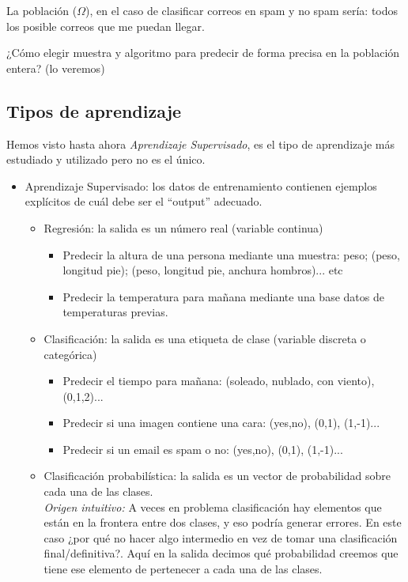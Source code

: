 \documentclass[11pt,a4paper]{article}
\theoremstyle{definition}
\begin{document}
	La población ($\Omega$), en el caso de clasificar correos en spam y no spam sería: todos los posible correos que me puedan llegar.
	
	¿Cómo elegir muestra y algoritmo para predecir de forma precisa en la población entera? (lo veremos)
	\subsection{Tipos de aprendizaje}
	Hemos visto hasta ahora \textit{Aprendizaje Supervisado}, es el tipo de aprendizaje más estudiado y utilizado pero no es el único.
	\begin{itemize}
		\item Aprendizaje Supervisado: los datos de entrenamiento contienen ejemplos explícitos de cuál debe ser el ``output'' adecuado. 
		\begin{itemize}
			\item Regresión: la salida es un número real (variable continua)
			\begin{itemize}
				\item Predecir la altura de una persona mediante una muestra: peso; (peso, longitud pie); (peso, longitud pie, anchura hombros)... etc
				\item Predecir la temperatura para mañana mediante una base datos de temperaturas previas.
			\end{itemize}
			\item Clasificación: la salida es una etiqueta de clase (variable discreta o categórica)
			\begin{itemize}
				\item Predecir el tiempo para mañana: (soleado, nublado, con viento), (0,1,2)...
				\item Predecir si una imagen contiene una cara: (yes,no), (0,1), (1,-1)...
				\item Predecir si un email es spam o no: (yes,no), (0,1), (1,-1)...
			\end{itemize}
			\item Clasificación probabilística: la salida es un vector de probabilidad sobre cada una de las clases. \\
			\textit{Origen intuitivo:} A veces en problema clasificación hay elementos que están en la frontera entre dos clases, y eso podría generar errores. En este caso ¿por qué no hacer algo intermedio en vez de tomar una clasificación final/definitiva?. Aquí en la salida decimos qué probabilidad creemos que tiene ese elemento de pertenecer a cada una de las clases.
		\end{itemize}

\end{itemize}
\end{document}
